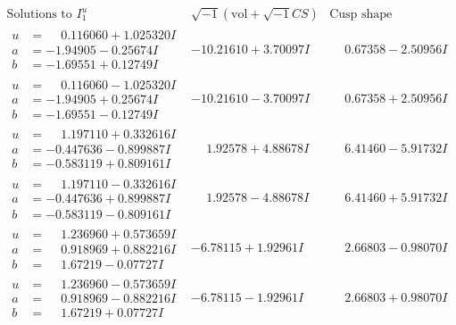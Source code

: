 \documentclass[1p]{elsarticle_modified}
\theoremstyle{definition}
\newcommand{\I}{\sqrt{-1}}
\begin{document}
$$\begin{array}{c|c|c}  
\text{Solutions to }I^u_{1}& \I (\text{vol} + \sqrt{-1}CS) & \text{Cusp shape}\\
 \hline 
\begin{aligned}
u &= \phantom{-}0.116060 + 1.025320 I \\
a &= -1.94905 - 0.25674 I \\
b &= -1.69551 + 0.12749 I\end{aligned}
 & -10.21610 + 3.70097 I & \phantom{-}0.67358 - 2.50956 I \\ \hline\begin{aligned}
u &= \phantom{-}0.116060 - 1.025320 I \\
a &= -1.94905 + 0.25674 I \\
b &= -1.69551 - 0.12749 I\end{aligned}
 & -10.21610 - 3.70097 I & \phantom{-}0.67358 + 2.50956 I \\ \hline\begin{aligned}
u &= \phantom{-}1.197110 + 0.332616 I \\
a &= -0.447636 - 0.899887 I \\
b &= -0.583119 + 0.809161 I\end{aligned}
 & \phantom{-}1.92578 + 4.88678 I & \phantom{-}6.41460 - 5.91732 I \\ \hline\begin{aligned}
u &= \phantom{-}1.197110 - 0.332616 I \\
a &= -0.447636 + 0.899887 I \\
b &= -0.583119 - 0.809161 I\end{aligned}
 & \phantom{-}1.92578 - 4.88678 I & \phantom{-}6.41460 + 5.91732 I \\ \hline\begin{aligned}
u &= \phantom{-}1.236960 + 0.573659 I \\
a &= \phantom{-}0.918969 + 0.882216 I \\
b &= \phantom{-}1.67219 - 0.07727 I\end{aligned}
 & -6.78115 + 1.92961 I & \phantom{-}2.66803 - 0.98070 I \\ \hline\begin{aligned}
u &= \phantom{-}1.236960 - 0.573659 I \\
a &= \phantom{-}0.918969 - 0.882216 I \\
b &= \phantom{-}1.67219 + 0.07727 I\end{aligned}
 & -6.78115 - 1.92961 I & \phantom{-}2.66803 + 0.98070 I \\ \hline\begin{aligned}

\end{aligned}
\end{array}$$
\end{document}
